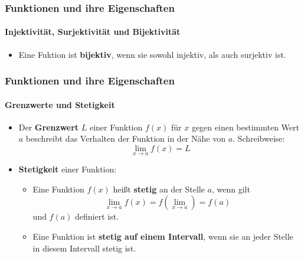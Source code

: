 \documentclass{beamer}
\begin{document}
\begin{frame}
    \frametitle{Funktionen und ihre Eigenschaften}
    \framesubtitle{Injektivität, Surjektivität und Bijektivität}
    \begin{itemize}
        \item Eine Fuktion ist \textbf{bijektiv}, wenn sie sowohl injektiv, als auch surjektiv ist.
    \end{itemize}
\end{frame}


\begin{frame}
  \frametitle{Funktionen und ihre Eigenschaften}
  \framesubtitle{Grenzwerte und Stetigkeit}

  \begin{itemize}
    \item Der \textbf{Grenzwert} $L$ einer Funktion $f(x)$ für $x$ gegen einen bestimmten Wert $a$ beschreibt das Verhalten der Funktion in der Nähe von $a$.
    Schreibweise: $$\lim_{x \to a} f(x) = L$$
    \item \textbf{Stetigkeit} einer Funktion:
      \begin{itemize}
        \item Eine Funktion $f(x)$ heißt \textbf{stetig} an der Stelle $a$, wenn gilt $$\lim_{x \to a} f(x) = f (\lim_{x \to a}) = f(a) $$  und $f(a)$ definiert ist.
        \item Eine Funktion ist \textbf{stetig auf einem Intervall}, wenn sie an jeder Stelle in diesem Intervall stetig ist.
      \end{itemize}
  \end{itemize}
\end{frame}
\end{document}
